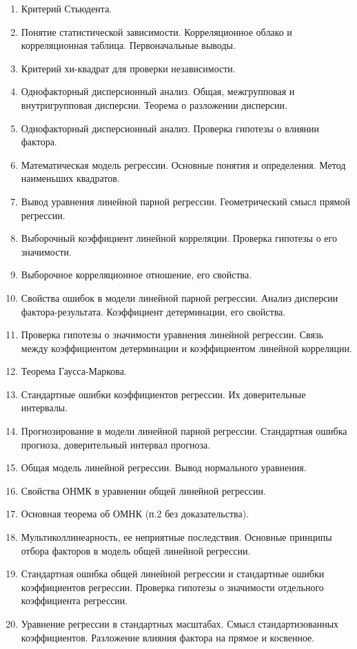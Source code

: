 \begin{enumerate}
    \item Критерий Стьюдента.
    \item Понятие статистической зависимости. Корреляционное облако и корреляционная таблица. Первоначальные выводы.
    \item Критерий хи-квадрат для проверки независимости.
    \item Однофакторный дисперсионный анализ. Общая, межгрупповая и внутригрупповая дисперсии. Теорема о разложении дисперсии.
    \item Однофакторный дисперсионный анализ. Проверка гипотезы о влиянии фактора.
    \item Математическая модель регрессии. Основные понятия и определения. Метод наименьших квадратов.
    \item Вывод уравнения линейной парной регрессии. Геометрический смысл прямой регрессии.
    \item Выборочный коэффициент линейной корреляции. Проверка гипотезы о его значимости.
    \item Выборочное корреляционное отношение, его свойства.
    \item Свойства ошибок в модели линейной парной регрессии. Анализ дисперсии фактора-результата. Коэффициент детерминации, его свойства.
    \item Проверка гипотезы о значимости уравнения линейной регрессии. Связь между коэффициентом детерминации и коэффициентом линейной корреляции.
    \item Теорема Гаусса-Маркова.
    \item Стандартные ошибки коэффициентов регрессии. Их доверительные интервалы.
    \item Прогнозирование в модели линейной парной регрессии. Стандартная ошибка прогноза, доверительный интервал прогноза.
    \item Общая модель линейной регрессии. Вывод нормального уравнения.
    \item Свойства ОНМК в уравнении общей линейной регрессии.
    \item Основная теорема об ОМНК (п.2 без доказательства).
    \item Мультиколлинеарность, ее неприятные последствия. Основные принципы отбора факторов в модель общей линейной регрессии.
    \item Стандартная ошибка общей линейной регрессии и стандартные ошибки коэффициентов регрессии. Проверка гипотезы о значимости отдельного коэффициента регрессии.
    \item Уравнение регрессии в стандартных масштабах. Смысл стандартизованных коэффициентов. Разложение влияния фактора на прямое и косвенное.

\end{enumerate}
